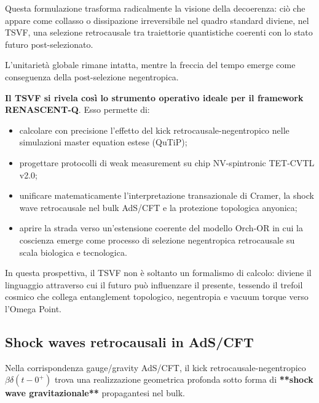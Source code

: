 \documentclass[11pt,a4paper]{article}
\theoremstyle{plain}
\theoremstyle{definition}
\begin{document}
Questa formulazione trasforma radicalmente la visione della decoerenza: ciò che appare come collasso o dissipazione irreversibile nel quadro standard diviene, nel TSVF, una selezione retrocausale tra traiettorie quantistiche coerenti con lo stato futuro post-selezionato. 

\vspace{0.3cm}


L’unitarietà globale rimane intatta, mentre la freccia del tempo emerge come conseguenza della post-selezione negentropica.

\vspace{0.6cm}

\textbf{Il TSVF si rivela così lo strumento operativo ideale per il framework RENASCENT-Q}. Esso permette di:
\begin{itemize}
    \item calcolare con precisione l’effetto del kick retrocausale-negentropico nelle simulazioni master equation estese (QuTiP);
    \item progettare protocolli di weak measurement su chip NV-spintronic TET-CVTL v2.0;
    \item unificare matematicamente l’interpretazione transazionale di Cramer, la shock wave retrocausale nel bulk AdS/CFT e la protezione topologica anyonica;
    \item aprire la strada verso un’estensione coerente del modello Orch-OR in cui la coscienza emerge come processo di selezione negentropica retrocausale su scala biologica e tecnologica.
\end{itemize}

\vspace{0.2cm}

In questa prospettiva, il TSVF non è soltanto un formalismo di calcolo: diviene il linguaggio attraverso cui il futuro può influenzare il presente, tessendo il trefoil cosmico che collega entanglement topologico, negentropia e vacuum torque verso l’Omega Point.


\vspace{0.4cm}



\subsection{Shock waves retrocausali in AdS/CFT}


\vspace{0.2cm}

Nella corrispondenza gauge/gravity AdS/CFT, il kick retrocausale-negentropico $\beta \delta(t-0^+)$ trova una realizzazione geometrica profonda sotto forma di \textbf{**shock wave gravitazionale**} propagantesi nel bulk. 
\end{document}
